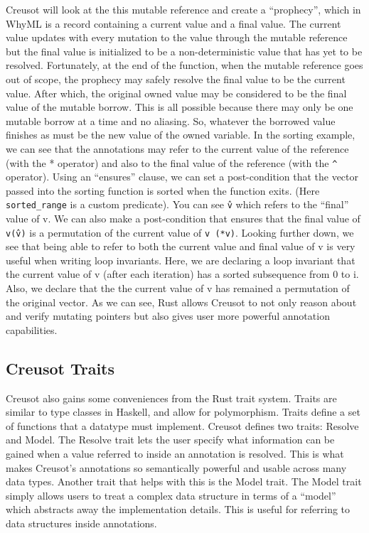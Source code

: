 \documentclass[12pt]{article}
\begin{document}
Creusot will look at the this mutable reference and create a ``prophecy'', which in WhyML is a record containing a current value and a final value. 
The current value updates with every mutation to the value through the mutable reference but the final value is initialized to be a non-deterministic value that has yet to be resolved. 
Fortunately, at the end of the function, when the mutable reference goes out of scope, the prophecy may safely resolve the final value to be the current value.
After which, the original owned value may be considered to be the final value of the mutable borrow. 
This is all possible because there may only be one mutable borrow at a time and no aliasing. 
So, whatever the borrowed value finishes as must be the new value of the owned variable. 
In the sorting example, we can see that the annotations may refer to the current value of the reference (with the * operator) and also to the final value of the reference (with the \texttt{\^} operator).
Using an ``ensures'' clause, we can set a post-condition that the vector passed into the sorting function is sorted when the function exits. 
(Here \texttt{sorted\_range} is a custom predicate). 
You can see \texttt{\^v} which refers to the ``final'' value of v. 
We can also make a post-condition that ensures that the final value of \texttt{v(\^v)} is a permutation of the current value of \texttt{v (*v)}.
Looking further down, we see that being able to refer to both the current value and final value of v is very useful when writing loop invariants. 
Here, we are declaring a loop invariant that the current value of v (after each iteration) has a sorted subsequence from 0 to i. 
Also, we declare that the the current value of v has remained a permutation of the original vector.  
As we can see, Rust allows Creusot to not only reason about and verify mutating pointers but also gives user more powerful annotation capabilities. 

\subsection{Creusot Traits}
Creusot also gains some conveniences from the Rust trait system. 
Traits are similar to type classes in Haskell, and allow for polymorphism. 
Traits define a set of functions that a datatype must implement. 
Creusot defines two traits: Resolve and Model. 
The Resolve trait lets the user specify what information can be gained when a value referred to inside an annotation is resolved. 
This is what makes Creusot's annotations so semantically powerful and usable across many data types. 
Another trait that helps with this is the Model trait. The Model trait simply allows users to treat a complex data structure in terms of a ``model'' which abstracts away the implementation details. 
This is useful for referring to data structures inside annotations.  
\end{document}
